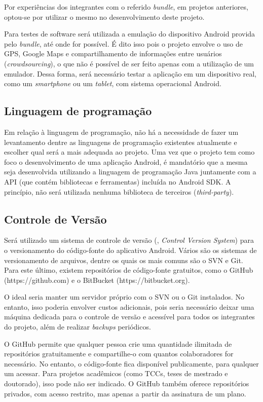 Por experiências dos integrantes com o referido \emph{bundle}, em projetos anteriores, optou-se por utilizar o mesmo no desenvolvimento deste projeto.

Para testes de software será utilizada a emulação do dispositivo Android provida pelo \emph{bundle}, até onde for possível. É dito isso pois o projeto envolve o uso de GPS, Google Maps e compartilhamento de informações entre usuários (\emph{crowdsourcing}), o que não é possível de ser feito apenas com a utilização de um emulador. Dessa forma, será necessário testar a aplicação em um dispositivo real, como um \emph{smartphone} ou um \emph{tablet}, com sistema operacional Android.

\subsection{Linguagem de programação}

Em relação à linguagem de programação, não há a necessidade de fazer um levantamento dentre as linguagens de programação existentes atualmente e escolher qual será a mais adequada ao projeto. Uma vez que o projeto tem como foco o desenvolvimento de uma aplicação Android, é mandatório que a mesma seja desenvolvida utilizando a linguagem de programação Java juntamente com a API (que contém bibliotecas e ferramentas) incluída no Android SDK. A princípio, não será utilizada nenhuma biblioteca de terceiros (\emph{third-party}).

\subsection{Controle de Versão}

Será utilizado um sistema de controle de versão (, \emph{Control Version System}) para o versionamento do código-fonte do aplicativo Android. Vários são os sistemas de versionamento de arquivos, dentre os quais os mais comuns são o SVN e Git. Para este último, existem repositórios de código-fonte gratuitos, como o GitHub (https://github.com) e o BitBucket (https://bitbucket.org).

O ideal seria manter um servidor próprio com o SVN ou o Git instalados. No entanto, isso poderia envolver custos adicionais, pois seria necessário deixar uma máquina dedicada para o controle de versão e acessível para todos os integrantes do projeto, além de realizar \emph{backups} periódicos.

O GitHub permite que qualquer pessoa crie uma quantidade ilimitada de repositórios gratuitamente e compartilhe-o com quantos colaboradores for necessário. No entanto, o código-fonte fica disponível publicamente, para qualquer um acessar. Para projetos acadêmicos (como TCCs, teses de mestrado e doutorado), isso pode não ser indicado. O GitHub também oferece repositórios privados, com acesso restrito, mas apenas a partir da assinatura de um plano.

